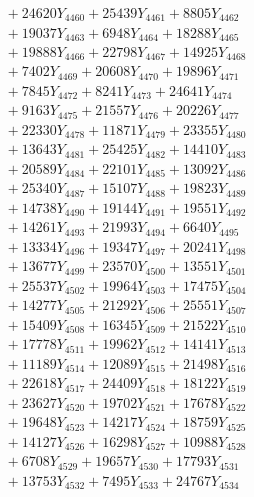 \documentclass[a4paper,10pt]{article}
\begin{document}
{\begin{align}
&\;  + 24620 Y_{4460} + 25439 Y_{4461} + 8805 Y_{4462} \\[0.3ex]
&\;  + 19037 Y_{4463} + 6948 Y_{4464} + 18288 Y_{4465} \\[0.3ex]
&\;  + 19888 Y_{4466} + 22798 Y_{4467} + 14925 Y_{4468} \\[0.5ex]\allowbreak
&\;  + 7402 Y_{4469} + 20608 Y_{4470} + 19896 Y_{4471} \\[0.3ex]
&\;  + 7845 Y_{4472} + 8241 Y_{4473} + 24641 Y_{4474} \\[0.3ex]
&\;  + 9163 Y_{4475} + 21557 Y_{4476} + 20226 Y_{4477} \\[0.3ex]
&\;  + 22330 Y_{4478} + 11871 Y_{4479} + 23355 Y_{4480} \\[0.3ex]
&\;  + 13643 Y_{4481} + 25425 Y_{4482} + 14410 Y_{4483} \\[0.3ex]
&\;  + 20589 Y_{4484} + 22101 Y_{4485} + 13092 Y_{4486} \\[0.3ex]
&\;  + 25340 Y_{4487} + 15107 Y_{4488} + 19823 Y_{4489} \\[0.3ex]
&\;  + 14738 Y_{4490} + 19144 Y_{4491} + 19551 Y_{4492} \\[0.3ex]
&\;  + 14261 Y_{4493} + 21993 Y_{4494} + 6640 Y_{4495} \\[0.3ex]
&\;  + 13334 Y_{4496} + 19347 Y_{4497} + 20241 Y_{4498} \\[0.5ex]\allowbreak
&\;  + 13677 Y_{4499} + 23570 Y_{4500} + 13551 Y_{4501} \\[0.3ex]
&\;  + 25537 Y_{4502} + 19964 Y_{4503} + 17475 Y_{4504} \\[0.3ex]
&\;  + 14277 Y_{4505} + 21292 Y_{4506} + 25551 Y_{4507} \\[0.3ex]
&\;  + 15409 Y_{4508} + 16345 Y_{4509} + 21522 Y_{4510} \\[0.3ex]
&\;  + 17778 Y_{4511} + 19962 Y_{4512} + 14141 Y_{4513} \\[0.3ex]
&\;  + 11189 Y_{4514} + 12089 Y_{4515} + 21498 Y_{4516} \\[0.3ex]
&\;  + 22618 Y_{4517} + 24409 Y_{4518} + 18122 Y_{4519} \\[0.3ex]
&\;  + 23627 Y_{4520} + 19702 Y_{4521} + 17678 Y_{4522} \\[0.3ex]
&\;  + 19648 Y_{4523} + 14217 Y_{4524} + 18759 Y_{4525} \\[0.3ex]
&\;  + 14127 Y_{4526} + 16298 Y_{4527} + 10988 Y_{4528} \\[0.5ex]\allowbreak
&\;  + 6708 Y_{4529} + 19657 Y_{4530} + 17793 Y_{4531} \\[0.3ex]
&\;  + 13753 Y_{4532} + 7495 Y_{4533} + 24767 Y_{4534} \\[0.3ex]

\end{align}}
\end{document}
